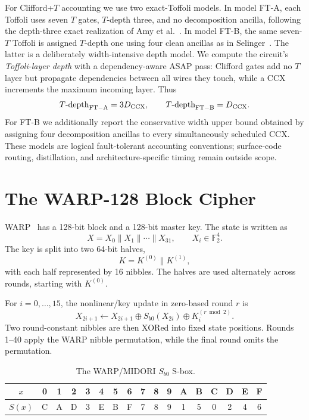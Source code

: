 \documentclass[10pt,a4paper]{article}
\newcommand{\F}{\mathbb{F}}
\newcommand{\Sb}{S_{b0}}
\begin{document}
For Clifford+$T$ accounting we use two exact-Toffoli models. In model FT-A, each Toffoli uses seven $T$ gates, $T$-depth three, and no decomposition ancilla, following the depth-three exact realization of Amy et al.~\cite{Amy2013}. In model FT-B, the same seven-$T$ Toffoli is assigned $T$-depth one using four clean ancillas as in Selinger~\cite{Selinger2013}. The latter is a deliberately width-intensive depth model. We compute the circuit's \emph{Toffoli-layer depth} with a dependency-aware ASAP pass: Clifford gates add no $T$ layer but propagate dependencies between all wires they touch, while a CCX increments the maximum incoming layer. Thus
\begin{equation}
T\text{-depth}_{\rm FT-A}=3D_{\rm CCX},\qquad
T\text{-depth}_{\rm FT-B}=D_{\rm CCX}.
\end{equation}
For FT-B we additionally report the conservative width upper bound obtained by assigning four decomposition ancillas to every simultaneously scheduled CCX. These models are logical fault-tolerant accounting conventions; surface-code routing, distillation, and architecture-specific timing remain outside scope.

\section{The WARP-128 Block Cipher}

WARP~\cite{WARP2020} has a 128-bit block and a 128-bit master key. The state is written as
\begin{equation}
    X = X_0\|X_1\|\cdots\|X_{31}, \qquad X_i\in\F_2^4.
\end{equation}
The key is split into two 64-bit halves,
\begin{equation}
    K = K^{(0)}\|K^{(1)},
\end{equation}
with each half represented by 16 nibbles. The halves are used alternately across rounds, starting with $K^{(0)}$.

For $i=0,\ldots,15$, the nonlinear/key update in zero-based round $r$ is
\begin{equation}
    X_{2i+1}\leftarrow X_{2i+1}\oplus \Sb(X_{2i})\oplus K^{(r\bmod 2)}_i.
    \label{eq:warp_subround}
\end{equation}
Two round-constant nibbles are then XORed into fixed state positions. Rounds 1--40 apply the WARP nibble permutation, while the final round omits the permutation.

\begin{table}[t]
\centering
\caption{The WARP/MIDORI $S_{b0}$ S-box.}
\label{tab:sbox}
\begin{tabular}{c|*{16}{c}}
\toprule
$x$ & 0 & 1 & 2 & 3 & 4 & 5 & 6 & 7 & 8 & 9 & A & B & C & D & E & F\\
\midrule
$S(x)$ & C & A & D & 3 & E & B & F & 7 & 8 & 9 & 1 & 5 & 0 & 2 & 4 & 6\\
\bottomrule
\end{tabular}
\end{table}
\end{document}
